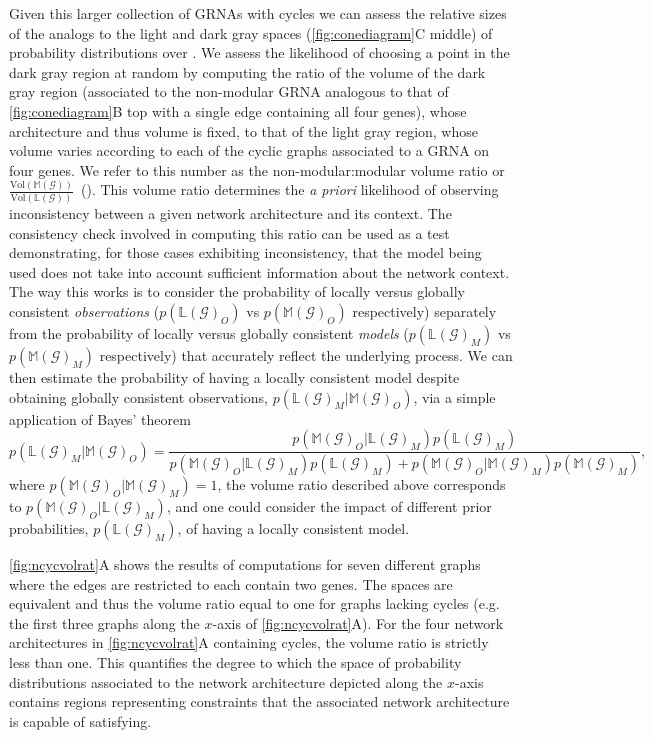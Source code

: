 Given this larger collection of GRNAs with cycles we can assess the relative sizes of the analogs to the light and dark gray spaces (\ref{fig:conediagram}C middle) of probability distributions over \gnpm{}. We assess the likelihood of choosing a point in the dark gray region at random by computing the ratio of the volume of the dark gray region (associated to the non-modular GRNA analogous to that of \ref{fig:conediagram}B top with a single edge containing all four genes), whose architecture and thus volume is fixed, to that of the light gray region, whose volume varies according to each of the cyclic graphs associated to a GRNA on four genes. We refer to this number as the non-modular:modular volume ratio or~$\frac{\text{Vol}(\mathbb{M}(\mathcal{G}))}{\text{Vol}(\mathbb{L}(\mathcal{G}))}$~(). This volume ratio determines the \emph{a priori} likelihood of observing inconsistency between a given network architecture and its context. The consistency check involved in computing this ratio can be used as a test demonstrating, for those cases exhibiting inconsistency, that the model being used does not take into account sufficient information about the network context. The way this works is to consider the probability of locally versus globally consistent \emph{observations} ($p(\mathbb{L}(\mathcal{G})_O)$  vs $p(\mathbb{M}(\mathcal{G})_O)$ respectively) separately from the probability of locally versus globally consistent \emph{models} ($p(\mathbb{L}(\mathcal{G})_M)$  vs $p(\mathbb{M}(\mathcal{G})_M)$ respectively) that accurately reflect the underlying process. We can then estimate the probability of having a locally consistent model despite obtaining globally consistent observations, $p(\mathbb{L}(\mathcal{G})_M | \mathbb{M}(\mathcal{G})_O)$, via a simple application of Bayes' theorem
$$
p(\mathbb{L}(\mathcal{G})_M | \mathbb{M}(\mathcal{G})_O) = \frac{p(\mathbb{M}(\mathcal{G})_O | \mathbb{L}(\mathcal{G})_M)p(\mathbb{L}(\mathcal{G})_M)}{p(\mathbb{M}(\mathcal{G})_O | \mathbb{L}(\mathcal{G})_M)p(\mathbb{L}(\mathcal{G})_M) + p(\mathbb{M}(\mathcal{G})_O | \mathbb{M}(\mathcal{G})_M)p(\mathbb{M}(\mathcal{G})_M)},
$$
where $p(\mathbb{M}(\mathcal{G})_O | \mathbb{M}(\mathcal{G})_M)=1$, the volume ratio described above corresponds to $p(\mathbb{M}(\mathcal{G})_O | \mathbb{L}(\mathcal{G})_M)$, and one could consider the impact of different prior probabilities, $p(\mathbb{L}(\mathcal{G})_M)$, of having a locally consistent model.

\ref{fig:ncycvolrat}A shows the results of computations for seven different graphs where the edges are restricted to each contain two genes. The spaces are equivalent and thus the volume ratio equal to one for graphs lacking cycles (e.g. the first three graphs along the $x$-axis of \ref{fig:ncycvolrat}A). For the four network architectures in \ref{fig:ncycvolrat}A containing cycles, the volume ratio is strictly less than one. This quantifies the degree to which the space of probability distributions associated to the network architecture depicted along the $x$-axis contains regions representing constraints that the associated network architecture is capable of satisfying.

